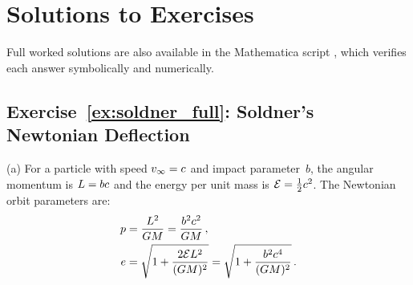 
\section{Solutions to Exercises}
\label{sec:deflection_solutions}

\noindent
Full worked solutions are also available in the Mathematica script
,
which verifies each answer symbolically and numerically.

\subsection*{Exercise~\ref{ex:soldner_full}: Soldner's Newtonian Deflection}

(a) For a particle with speed $v_\infty = c$ and
impact parameter~$b$, the angular momentum is $L = bc$ and the
energy per unit mass is $\mathcal{E} = \tfrac{1}{2} c^2$.  The
Newtonian orbit parameters are:
\begin{align*}
    p &= \frac{L^2}{G M} = \frac{b^2 c^2}{G M} \,, \\
    e &= \sqrt{1 + \frac{2\mathcal{E} L^2}{(G M)^2}}
      = \sqrt{1 + \frac{b^2 c^4}{(G M)^2}} \,.
\end{align*}


